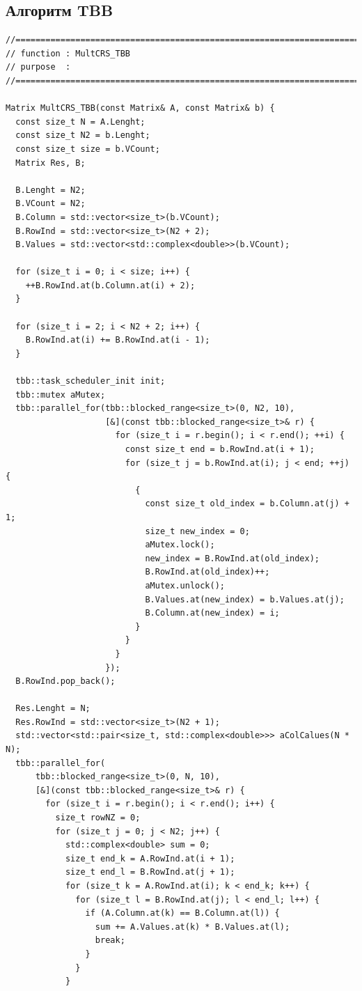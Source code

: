 \documentclass{report}
\begin{document}
\subsection*{Алгоритм TBB}
\begin{lstlisting}
//=======================================================================
// function : MultCRS_TBB
// purpose  :
//=======================================================================

Matrix MultCRS_TBB(const Matrix& A, const Matrix& b) {
  const size_t N = A.Lenght;
  const size_t N2 = b.Lenght;
  const size_t size = b.VCount;
  Matrix Res, B;

  B.Lenght = N2;
  B.VCount = N2;
  B.Column = std::vector<size_t>(b.VCount);
  B.RowInd = std::vector<size_t>(N2 + 2);
  B.Values = std::vector<std::complex<double>>(b.VCount);

  for (size_t i = 0; i < size; i++) {
    ++B.RowInd.at(b.Column.at(i) + 2);
  }

  for (size_t i = 2; i < N2 + 2; i++) {
    B.RowInd.at(i) += B.RowInd.at(i - 1);
  }

  tbb::task_scheduler_init init;
  tbb::mutex aMutex;
  tbb::parallel_for(tbb::blocked_range<size_t>(0, N2, 10),
                    [&](const tbb::blocked_range<size_t>& r) {
                      for (size_t i = r.begin(); i < r.end(); ++i) {
                        const size_t end = b.RowInd.at(i + 1);
                        for (size_t j = b.RowInd.at(i); j < end; ++j) {
                          {
                            const size_t old_index = b.Column.at(j) + 1;
                            size_t new_index = 0;
                            aMutex.lock();
                            new_index = B.RowInd.at(old_index);
                            B.RowInd.at(old_index)++;
                            aMutex.unlock();
                            B.Values.at(new_index) = b.Values.at(j);
                            B.Column.at(new_index) = i;
                          }
                        }
                      }
                    });
  B.RowInd.pop_back();

  Res.Lenght = N;
  Res.RowInd = std::vector<size_t>(N2 + 1);
  std::vector<std::pair<size_t, std::complex<double>>> aColCalues(N * N);
  tbb::parallel_for(
      tbb::blocked_range<size_t>(0, N, 10),
      [&](const tbb::blocked_range<size_t>& r) {
        for (size_t i = r.begin(); i < r.end(); i++) {
          size_t rowNZ = 0;
          for (size_t j = 0; j < N2; j++) {
            std::complex<double> sum = 0;
            size_t end_k = A.RowInd.at(i + 1);
            size_t end_l = B.RowInd.at(j + 1);
            for (size_t k = A.RowInd.at(i); k < end_k; k++) {
              for (size_t l = B.RowInd.at(j); l < end_l; l++) {
                if (A.Column.at(k) == B.Column.at(l)) {
                  sum += A.Values.at(k) * B.Values.at(l);
                  break;
                }
              }
            }


\end{lstlisting}
\end{document}
